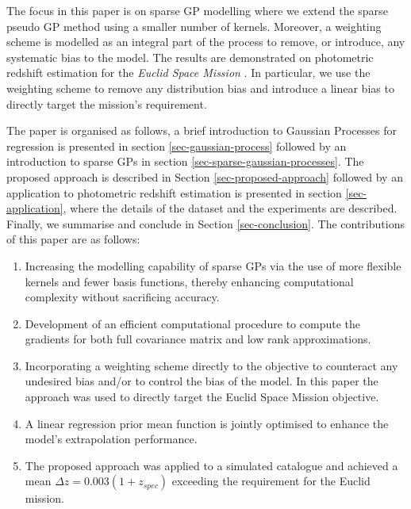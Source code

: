 \documentclass[useAMS,usenatbib,fleqn]{mn2e}
\begin{document}
The focus in this paper is on sparse GP modelling where we extend the sparse pseudo GP method using a smaller number of kernels. Moreover, a weighting scheme is modelled as an integral part of the process to remove, or introduce, any systematic bias to the model. The results are demonstrated on photometric redshift estimation for the {\em Euclid Space Mission} \citep{laureijs2011}. In particular, we use the weighting scheme to remove any distribution bias and introduce a linear bias to directly target the mission's requirement. 

The paper is organised as follows, a brief introduction to Gaussian Processes for regression is presented in section \ref{sec-gaussian-process} followed by an introduction to sparse GPs in section \ref{sec-sparse-gaussian-processes}. The proposed approach is described in Section \ref{sec-proposed-approach} followed by an application to photometric redshift estimation is presented in section \ref{sec-application}, where the details of the dataset and the experiments are described. Finally, we summarise and conclude in Section \ref{sec-conclusion}. The contributions of this paper are as follows:
\begin{enumerate}
  \item Increasing the modelling capability of sparse GPs via the use of more flexible kernels and fewer basis functions, thereby enhancing computational complexity without sacrificing accuracy.
  \item Development of an efficient computational procedure to compute the gradients for both full covariance matrix and low rank approximations.
  \item Incorporating a weighting scheme directly to the objective to counteract any undesired bias and/or to control the bias of the model. In this paper the approach was used to directly target the Euclid Space Mission objective.
  \item A linear regression prior mean function is jointly optimised to enhance the model's extrapolation performance.
  \item The proposed approach was applied to a simulated catalogue and achieved  a mean $\Delta z = 0.003(1+z_{spec})$ exceeding the requirement for the Euclid mission.
\end{enumerate}
\end{document}
